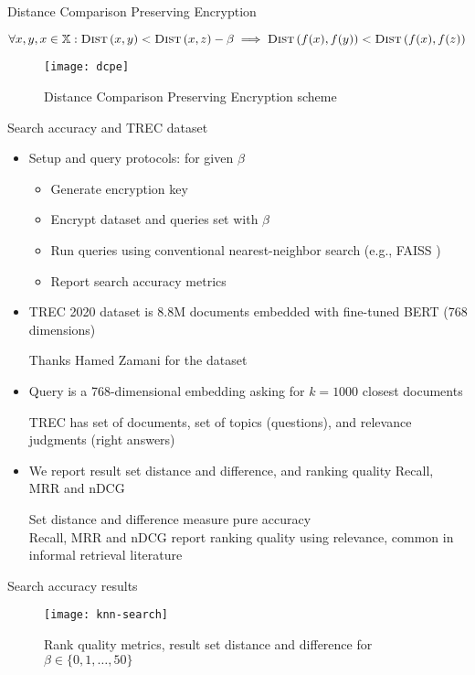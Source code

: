 	\begin{frame}{Distance Comparison Preserving Encryption}

		\[
			\forall x, y, x \in \mathbb{X} : \algo{Dist}{x, y} < \algo{Dist}{x, z} - \beta \implies \algo{Dist}{f(x), f(y)} < \algo{Dist}{f(x), f(z)}
		\]

		\begin{figure}[h]
			\centering
			\texttt{[image: dcpe]}
			\caption{Distance Comparison Preserving Encryption scheme \cite{dcpe}}%
		\end{figure}

	\end{frame}

	\begin{frame}{Search accuracy and TREC dataset}

		\begin{itemize}
			\item<1->
				Setup and query protocols: for given $\beta$
				\begin{itemize}
					\item Generate encryption key
					\item Encrypt dataset and queries set with $\beta$
					\item Run queries using conventional nearest-neighbor search (e.g., FAISS \cite{faiss})
					\item Report search accuracy metrics
				\end{itemize}

			\item<2->
				TREC 2020 dataset is 8.8M documents embedded with fine-tuned BERT \cite{bert} (768 dimensions) \\
				\begin{small}
					Thanks Hamed Zamani for the dataset
				\end{small}

			\item<3->
				Query is a 768-dimensional embedding asking for $k = \num{1000}$ closest documents \\
				\begin{small}
					TREC has set of documents, set of topics (questions), and relevance judgments (right answers)
				\end{small}

			\item<4->
				We report result set distance and difference, and ranking quality Recall, MRR and nDCG \\
				\begin{small}
					Set distance and difference measure pure \knn{} accuracy \\
					Recall, MRR and nDCG report ranking quality using relevance, common in informal retrieval literature
				\end{small}

		\end{itemize}

	\end{frame}

	\begin{frame}{Search accuracy results}

		\begin{figure}[h]
			\centering
			\texttt{[image: knn-search]}
			\caption{Rank quality metrics, result set distance and difference for $\beta \in \{ 0, 1, \ldots , 50 \} $}
		\end{figure}

	\end{frame}
